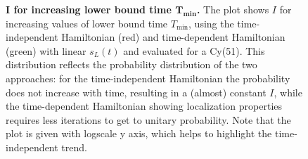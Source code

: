 \begin{figure}[ht]
  \centering
  \caption{\textbf{$\bm{I}$ for increasing lower bound time $\bm{T_{\min}}$. }The plot shows $I$ for increasing values of lower bound time $T_{\min}$, using the time-independent Hamiltonian (red) and time-dependent Hamiltonian (green) with linear $s_L(t)$ and evaluated for a Cy(51). This distribution reflects the probability distribution of the two approaches: for the time-independent Hamiltonian the probability does not increase with time, resulting in a (almost) constant $I$, while the time-dependent Hamiltonian showing localization properties requires less iterations to get to unitary probability. Note that the plot is given with logscale y axis, which helps to highlight the time-independent trend. }
  \label{fig:iters_increasing_time}
\end{figure}
